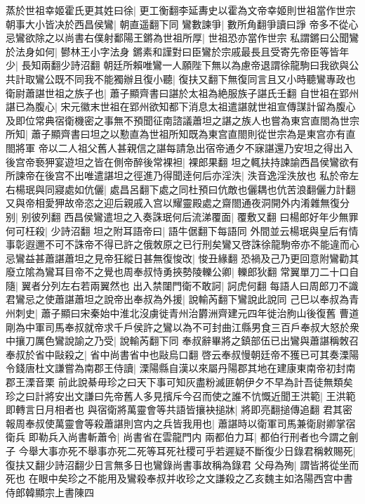 蒸於世祖幸姬霍氏更其姓曰徐|{
	更工衡翻李延夀史以霍為文帝幸姬則世祖當作世宗}
朝事大小皆决於西昌侯鸞|{
	朝直遥翻下同}
鸞數諫爭|{
	數所角翻爭讀曰諍}
帝多不從心忌鸞欲除之以尚書右僕射鄱陽王鏘為世祖所厚|{
	世祖恐亦當作世宗}
私謂鏘曰公聞鸞於法身如何|{
	鬰林王小字法身}
鏘素和謹對曰臣鸞於宗戚最長且受寄先帝臣等皆年少|{
	長知兩翻少詩沼翻}
朝廷所賴唯鸞一人願陛下無以為慮帝退謂徐龍駒曰我欲與公共計取鸞公既不同我不能獨辦且復小聽|{
	復扶又翻下無復同言且又小時聽鸞專政也}
衛尉蕭諶世祖之族子也|{
	蕭子顯齊書曰諶於太祖為絶服族子諶氏壬翻}
自世祖在郢州諶已為腹心|{
	宋元徽末世祖在郢州欲知都下消息太祖遣諶就世祖宣傳謀計留為腹心}
及即位常典宿衛機密之事無不預聞征南諮議蕭坦之諶之族人也嘗為東宫直閤為世宗所知|{
	蕭子顯齊書曰坦之以懃直為世祖所知既為東宫直閤則從世宗為是東宫亦有直閤將軍}
帝以二人祖父舊人甚親信之諶每請急出宿帝通夕不寐諶還乃安坦之得出入後宫帝䙝狎宴遊坦之皆在側帝醉後常裸袒|{
	裸郎果翻}
坦之輒扶持諫諭西昌侯鸞欲有所諫帝在後宫不出唯遣諶坦之徑進乃得聞逹何后亦淫泆|{
	泆音逸淫泆放也}
私於帝左右楊珉與同寢處如伉儷|{
	處昌呂翻下處之同杜預曰伉敵也儷耦也伉苦浪翻儷力計翻}
又與帝相愛狎故帝恣之迎后親戚入宫以耀靈殿處之齋閤通夜洞開外内淆雜無復分别|{
	别彼列翻}
西昌侯鸞遣坦之入奏誅珉何后流涕覆面|{
	覆敷又翻}
曰楊郎好年少無罪何可枉殺|{
	少詩沼翻}
坦之附耳語帝曰|{
	語牛倨翻下每語同}
外間並云楊珉與皇后有情事彰遐邇不可不誅帝不得已許之俄敇原之已行刑矣鸞又啓誅徐龍駒帝亦不能違而心忌鸞益甚蕭諶蕭坦之見帝狂縱日甚無復悛改|{
	悛丑緣翻}
恐禍及己乃更回意附鸞勸其廢立隂為鸞耳目帝不之覺也周奉叔恃勇挾勢陵轢公卿|{
	轢郎狄翻}
常翼單刀二十口自隨|{
	翼者分列左右若兩翼然也}
出入禁闥門衛不敢訶|{
	訶虎何翻}
每語人曰周郎刀不識君鸞忌之使蕭諶蕭坦之說帝出奉叔為外援|{
	說輸芮翻下鸞說此說同}
己巳以奉叔為青州刺史|{
	蕭子顯曰宋秦始中淮北沒虜徙青州治欝洲齊建元四年徙治胊山後復舊}
曹道剛為中軍司馬奉叔就帝求千戶侯許之鸞以為不可封曲江縣男食三百戶奉叔大怒於衆中攘刀厲色鸞說諭之乃受|{
	說輸芮翻下同}
奉叔辭畢將之鎮部伍已出鸞與蕭諶稱敇召奉叔於省中敺殺之|{
	省中尚書省中也敺烏口翻}
啓云奉叔慢朝廷帝不獲已可其奏溧陽令錢唐杜文謙嘗為南郡王侍讀|{
	溧陽縣自漢以來屬丹陽郡其地在建康東南帝初封南郡王溧音栗}
前此說綦毋珍之曰天下事可知灰盡粉滅匪朝伊夕不早為計吾徒無類矣珍之曰計將安出文謙曰先帝舊人多見擯斥今召而使之誰不忼慨近聞王洪範|{
	王洪範即轉言日月相者也}
與宿衛將萬靈會等共語皆攘袂搥牀|{
	將即亮翻搥傳追翻}
君其密報周奉叔使萬靈會等殺蕭諶則宫内之兵皆我用也|{
	蕭諶時以衛軍司馬兼衛尉卿掌宿衛兵}
即勒兵入尚書斬蕭令|{
	尚書省在雲龍門内}
兩都伯力耳|{
	都伯行刑者也今謂之劊子}
今舉大事亦死不舉事亦死二死等耳死社稷可乎若遲疑不斷復少日錄君稱敕賜死|{
	復扶又翻少詩沼翻少日言無多日也鸞錄尚書事故稱為錄君}
父母為殉|{
	謂皆將從坐而死也}
在眼中矣珍之不能用及鸞殺奉叔并收珍之文謙殺之乙亥魏主如洛陽西宫中書侍郎韓顯宗上書陳四

